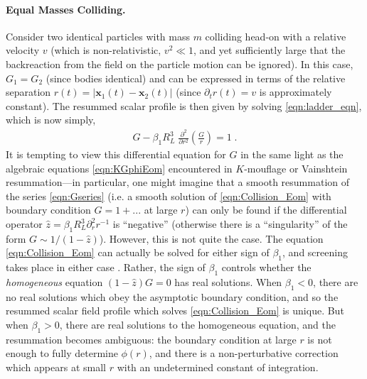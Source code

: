 \documentclass[11pt]{article}
\begin{document}
\paragraph{Equal Masses Colliding.}
Consider two identical particles with mass $m$ colliding head-on with a relative velocity $v$ (which is non-relativistic, $v^2 \ll 1$, and yet sufficiently large that the backreaction from the field on the particle motion can be ignored). In this case, $G_1 = G_2$ (since bodies identical) and can be expressed in terms of the relative separation $r (t) = | \mathbf{x}_1 (t) - \mathbf{x}_2 (t) |$ (since $\partial_t r (t) = v$ is approximately constant). The resummed scalar profile is then given by solving \eqref{eqn:ladder_eqn}, which is now simply,
\begin{align}
 G - \beta_1  R_L^3 \;   \frac{\partial^2}{ \partial r^2} \left( \frac{G}{r} \right)  =  1 \; .
 \label{eqn:Collision_Eom}
\end{align}
It is tempting to view this differential equation for $G$ in the same light as the algebraic equations \eqref{eqn:KGphiEom} encountered in $K$-mouflage or Vainshtein resummation---in particular, one might imagine that a smooth resummation of the series \eqref{eqn:Gseries} (i.e. a smooth solution of \eqref{eqn:Collision_Eom} with boundary condition $G = 1 + ...$ at large $r$) can only be found if the differential operator $\hat{z} = \beta_1 R_L^3 \partial_r^2 r^{-1}$ is ``negative'' (otherwise there is a ``singularity'' of the form $G \sim 1/(1- \hat{z})$). However, this is not quite the case. The equation \eqref{eqn:Collision_Eom} can actually be solved for either sign of $\beta_1$, and screening takes place in either case \cite{Davis:2019ltc}. 
Rather, the sign of $\beta_1$ controls whether the \emph{homogeneous} equation $(1 - \hat{z}) G = 0$ has real solutions. When $\beta_1 < 0$, there are no real solutions which obey the asymptotic boundary condition, and so the resummed scalar field profile which solves \eqref{eqn:Collision_Eom} is unique. But when $\beta_1 > 0$, 
there are real solutions to the homogeneous equation, and the resummation becomes ambiguous: the boundary condition at large $r$ is not enough to fully determine $\phi (r)$, and there is a non-perturbative correction which appears at small $r$ with an undetermined constant of integration. 
\end{document}
